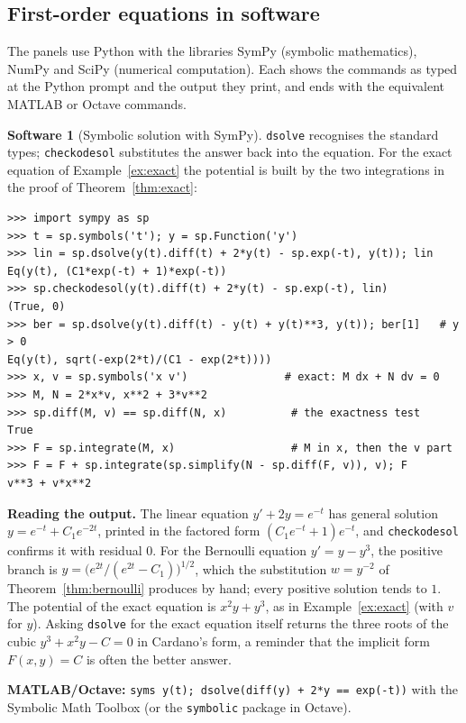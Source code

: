 \documentclass[11pt,a4paper]{article}
\numberwithin{equation}{section}
\theoremstyle{definition}
\newtheorem{software}[thm]{Software}
\begin{document}
\subsection{First-order equations in software}
\label{ssec:software1}

The panels use Python with the libraries SymPy (symbolic mathematics), NumPy and SciPy (numerical computation). Each shows the commands as typed at the
Python prompt and the output they print, and ends with the equivalent MATLAB or Octave commands.

\begin{software}[Symbolic solution with SymPy]
\label{sw:sympy1}
\texttt{dsolve} recognises the standard types; \texttt{checkodesol} substitutes the answer back into the equation. For the exact equation of Example~\ref{ex:exact} the
potential is built by the two integrations in the proof of Theorem~\ref{thm:exact}:
{\small\begin{verbatim}
>>> import sympy as sp
>>> t = sp.symbols('t'); y = sp.Function('y')
>>> lin = sp.dsolve(y(t).diff(t) + 2*y(t) - sp.exp(-t), y(t)); lin
Eq(y(t), (C1*exp(-t) + 1)*exp(-t))
>>> sp.checkodesol(y(t).diff(t) + 2*y(t) - sp.exp(-t), lin)
(True, 0)
>>> ber = sp.dsolve(y(t).diff(t) - y(t) + y(t)**3, y(t)); ber[1]   # y > 0
Eq(y(t), sqrt(-exp(2*t)/(C1 - exp(2*t))))
>>> x, v = sp.symbols('x v')               # exact: M dx + N dv = 0
>>> M, N = 2*x*v, x**2 + 3*v**2
>>> sp.diff(M, v) == sp.diff(N, x)          # the exactness test
True
>>> F = sp.integrate(M, x)                  # M in x, then the v part
>>> F = F + sp.integrate(sp.simplify(N - sp.diff(F, v)), v); F
v**3 + v*x**2
\end{verbatim}}
\textbf{Reading the output.} The linear equation $y' + 2y = e^{-t}$ has general solution $y = e^{-t} + C_1e^{-2t}$, printed in the factored form $(C_1e^{-t} + 1)e^{-t}$, and \texttt{checkodesol}
confirms it with residual $0$. For the Bernoulli equation $y' = y - y^3$, the positive branch is $y = \bigl(e^{2t}/(e^{2t} - C_1)\bigr)^{1/2}$, which the substitution $w = y^{-2}$ of
Theorem~\ref{thm:bernoulli} produces by hand; every positive solution tends to $1$. The potential of the exact equation is $x^2y + y^3$, as in Example~\ref{ex:exact} (with $v$ for $y$). Asking \texttt{dsolve}
for the exact equation itself returns the three roots of the cubic $y^3 + x^2y - C = 0$ in Cardano's form, a reminder that the implicit form $F(x, y) = C$ is often the
better answer.

\textbf{MATLAB/Octave:} \texttt{syms y(t); dsolve(diff(y) + 2*y == exp(-t))} with the Symbolic Math Toolbox (or the \texttt{symbolic} package in Octave).
\end{software}
\end{document}
